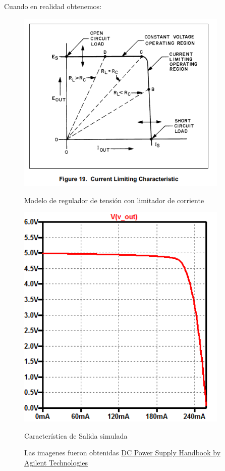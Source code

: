 Cuando en realidad obtenemos:
\begin{figure}[H]
	\centering
	\begin{minipage}{0.45\textwidth}
		\centering
		\includegraphics[width=0.9\textwidth]{ImagenesEjercicio1/CVCL.PNG} %
		\caption{Modelo de regulador de tensión con limitador de corriente}
	\end{minipage}\hfill
	\begin{minipage}{0.45\textwidth}
		\centering
		\includegraphics[width=0.9\textwidth]{ImagenesEjercicio1/CaracteristicaDeSalidaConGrillaFL2.png} %
		\caption{Característica de Salida simulada}
	\end{minipage}
\caption*{Las imagenes fueron obtenidas \href{https://ia600205.us.archive.org/22/items/DC_Power_Supply_Handbook_Agilent_Technologies_Application_Note_90B/DC_Power_Supply_Handbook_Agilent_Technologies_Application_Note_90B.pdf}{DC Power Supply Handbook by Agilent Technologies}
}
\end{figure}

